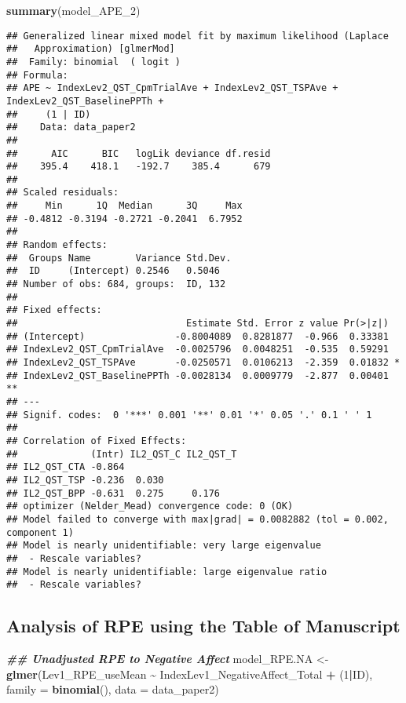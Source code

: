\documentclass[
  12pt,
]{article}
\newenvironment{Shaded}{\begin{snugshade}}{\end{snugshade}}
\newcommand{\AttributeTok}[1]{\textcolor[rgb]{0.13,0.29,0.53}{#1}}
\newcommand{\DecValTok}[1]{\textcolor[rgb]{0.00,0.00,0.81}{#1}}
\newcommand{\DocumentationTok}[1]{\textcolor[rgb]{0.56,0.35,0.01}{\textbf{\textit{#1}}}}
\newcommand{\FunctionTok}[1]{\textcolor[rgb]{0.13,0.29,0.53}{\textbf{#1}}}
\newcommand{\NormalTok}[1]{#1}
\newcommand{\OtherTok}[1]{\textcolor[rgb]{0.56,0.35,0.01}{#1}}
\newcommand{\SpecialCharTok}[1]{\textcolor[rgb]{0.81,0.36,0.00}{\textbf{#1}}}
\begin{document}
\begin{Shaded}
\begin{Highlighting}[]
\FunctionTok{summary}\NormalTok{(model\_APE\_2)}
\end{Highlighting}
\end{Shaded}

\begin{verbatim}
## Generalized linear mixed model fit by maximum likelihood (Laplace
##   Approximation) [glmerMod]
##  Family: binomial  ( logit )
## Formula: 
## APE ~ IndexLev2_QST_CpmTrialAve + IndexLev2_QST_TSPAve + IndexLev2_QST_BaselinePPTh +  
##     (1 | ID)
##    Data: data_paper2
## 
##      AIC      BIC   logLik deviance df.resid 
##    395.4    418.1   -192.7    385.4      679 
## 
## Scaled residuals: 
##     Min      1Q  Median      3Q     Max 
## -0.4812 -0.3194 -0.2721 -0.2041  6.7952 
## 
## Random effects:
##  Groups Name        Variance Std.Dev.
##  ID     (Intercept) 0.2546   0.5046  
## Number of obs: 684, groups:  ID, 132
## 
## Fixed effects:
##                              Estimate Std. Error z value Pr(>|z|)   
## (Intercept)                -0.8004089  0.8281877  -0.966  0.33381   
## IndexLev2_QST_CpmTrialAve  -0.0025796  0.0048251  -0.535  0.59291   
## IndexLev2_QST_TSPAve       -0.0250571  0.0106213  -2.359  0.01832 * 
## IndexLev2_QST_BaselinePPTh -0.0028134  0.0009779  -2.877  0.00401 **
## ---
## Signif. codes:  0 '***' 0.001 '**' 0.01 '*' 0.05 '.' 0.1 ' ' 1
## 
## Correlation of Fixed Effects:
##             (Intr) IL2_QST_C IL2_QST_T
## IL2_QST_CTA -0.864                    
## IL2_QST_TSP -0.236  0.030             
## IL2_QST_BPP -0.631  0.275     0.176   
## optimizer (Nelder_Mead) convergence code: 0 (OK)
## Model failed to converge with max|grad| = 0.0082882 (tol = 0.002, component 1)
## Model is nearly unidentifiable: very large eigenvalue
##  - Rescale variables?
## Model is nearly unidentifiable: large eigenvalue ratio
##  - Rescale variables?
\end{verbatim}

\hypertarget{analysis-of-rpe-using-the-table-of-manuscript}{%
\subsection{Analysis of RPE using the Table of
Manuscript}\label{analysis-of-rpe-using-the-table-of-manuscript}}

\begin{Shaded}
\begin{Highlighting}[]
\DocumentationTok{\#\# Unadjusted RPE to Negative Affect}
\NormalTok{model\_RPE.NA }\OtherTok{\textless{}{-}} \FunctionTok{glmer}\NormalTok{(Lev1\_RPE\_useMean }\SpecialCharTok{\textasciitilde{}}\NormalTok{ IndexLev1\_NegativeAffect\_Total }\SpecialCharTok{+}\NormalTok{ (}\DecValTok{1}\SpecialCharTok{|}\NormalTok{ID), }\AttributeTok{family =} \FunctionTok{binomial}\NormalTok{(), }\AttributeTok{data =}\NormalTok{ data\_paper2)}
\end{Highlighting}
\end{Shaded}
\end{document}
